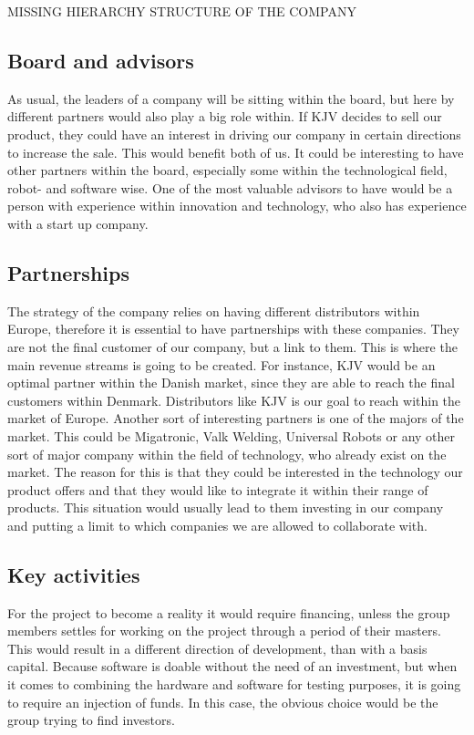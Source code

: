 MISSING HIERARCHY STRUCTURE OF THE COMPANY 

\subsection{Board and advisors}
As usual, the leaders of a company will be sitting within the board, but here by different partners would also play a big role within. If KJV decides to sell our product, they could have an interest in driving our company in certain directions to increase the sale. This would benefit both of us. 
It could be interesting to have other partners within the board, especially some within the technological field, robot- and software wise.
One of the most valuable advisors to have would be a person with experience within innovation and technology, who also has experience with a start up company. 

\subsection{Partnerships}
The strategy of the company relies on having different distributors within Europe, therefore it is essential to have partnerships with these companies. They are not the final customer of our company, but a link to them. This is where the main revenue streams is going to be created.
For instance, KJV would be an optimal partner within the Danish market, since they are able to reach the final customers within Denmark. Distributors like KJV is our goal to reach within the market of Europe.
Another sort of interesting partners is one of the majors of the market. This could be Migatronic, Valk Welding, Universal Robots or any other sort of major company within the field of technology, who already exist on the market. The reason for this is that they could be interested in the technology our product offers and that they would like to integrate it within their range of products. This situation would usually lead to them investing in our company and putting a limit to which companies we are allowed to collaborate with.

\subsection{Key activities}
For the project to become a reality it would require financing, unless the group members settles for working on the project through a period of their masters. This would result in a different direction of development, than with a basis capital. Because software is doable without the need of an investment, but when it comes to combining the hardware and software for testing purposes, it is going to require an injection of funds. In this case, the obvious choice would be the group trying to find investors.

